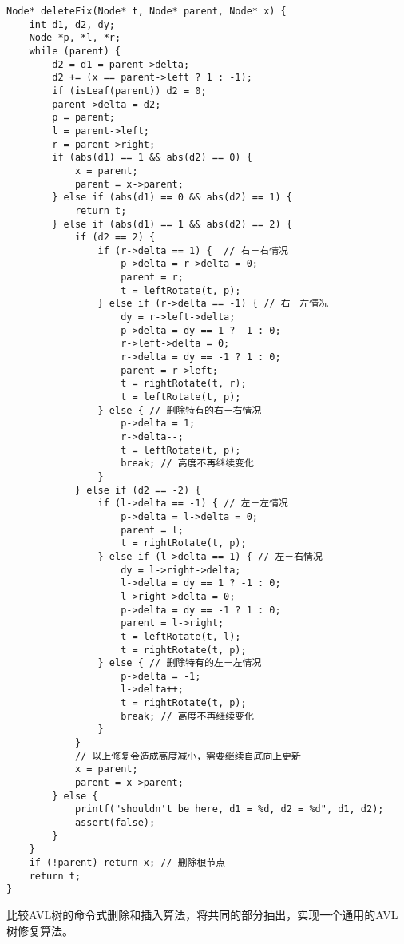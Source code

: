 \documentclass{ctexart}
\begin{document}
\begin{lstlisting}
Node* deleteFix(Node* t, Node* parent, Node* x) {
    int d1, d2, dy;
    Node *p, *l, *r;
    while (parent) {
        d2 = d1 = parent->delta;
        d2 += (x == parent->left ? 1 : -1);
        if (isLeaf(parent)) d2 = 0;
        parent->delta = d2;
        p = parent;
        l = parent->left;
        r = parent->right;
        if (abs(d1) == 1 && abs(d2) == 0) {
            x = parent;
            parent = x->parent;
        } else if (abs(d1) == 0 && abs(d2) == 1) {
            return t;
        } else if (abs(d1) == 1 && abs(d2) == 2) {
            if (d2 == 2) {
                if (r->delta == 1) {  // 右－右情况
                    p->delta = r->delta = 0;
                    parent = r;
                    t = leftRotate(t, p);
                } else if (r->delta == -1) { // 右－左情况
                    dy = r->left->delta;
                    p->delta = dy == 1 ? -1 : 0;
                    r->left->delta = 0;
                    r->delta = dy == -1 ? 1 : 0;
                    parent = r->left;
                    t = rightRotate(t, r);
                    t = leftRotate(t, p);
                } else { // 删除特有的右－右情况
                    p->delta = 1;
                    r->delta--;
                    t = leftRotate(t, p);
                    break; // 高度不再继续变化
                }
            } else if (d2 == -2) {
                if (l->delta == -1) { // 左－左情况
                    p->delta = l->delta = 0;
                    parent = l;
                    t = rightRotate(t, p);
                } else if (l->delta == 1) { // 左－右情况
                    dy = l->right->delta;
                    l->delta = dy == 1 ? -1 : 0;
                    l->right->delta = 0;
                    p->delta = dy == -1 ? 1 : 0;
                    parent = l->right;
                    t = leftRotate(t, l);
                    t = rightRotate(t, p);
                } else { // 删除特有的左－左情况
                    p->delta = -1;
                    l->delta++;
                    t = rightRotate(t, p);
                    break; // 高度不再继续变化
                }
            }
            // 以上修复会造成高度减小，需要继续自底向上更新
            x = parent;
            parent = x->parent;
        } else {
            printf("shouldn't be here, d1 = %d, d2 = %d", d1, d2);
            assert(false);
        }
    }
    if (!parent) return x; // 删除根节点
    return t;
}
\end{lstlisting}

\begin{Exercise}
比较AVL树的命令式删除和插入算法，将共同的部分抽出，实现一个通用的AVL树修复算法。
\end{Exercise}

\ifx\wholebook\relax \else


\end{document}
